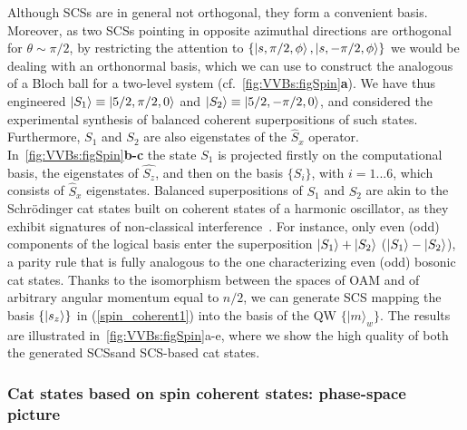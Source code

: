Although \acp{SCS} are in general not orthogonal, they form a convenient basis. Moreover, as two \acp{SCS} pointing in opposite azimuthal directions are orthogonal for $\theta\sim\pi/2$, by restricting the attention to $\{\ket{s,\pi/2,\phi},\ket{s,-\pi/2,\phi}\}$ we would be dealing with an orthonormal basis, which we can use to construct the analogous of a Bloch ball for a two-level system (cf.~\cref{fig:VVBs:figSpin}\textbf{a}). We have thus engineered $\ket{S_1}\equiv\ket{5/2,\pi/2,0}$ and $\ket{S_2}\equiv\ket{5/2,-\pi/2,0}$, and considered the experimental synthesis of balanced coherent superpositions of such states.
Furthermore, $S_1$ and $S_2$ are also eigenstates of the $\hat{S}_x$ operator. In~\cref{fig:VVBs:figSpin}\textbf{b-c} the state $S_1$ is projected firstly on the computational basis, the eigenstates of $\hat{S_z}$, and then on the basis $\{S_i\}$, with $i=1...6$, which consists of $\hat{S}_x$ eigenstates. Balanced superpositions of $S_1$ and $S_2$ are akin to the Schrödinger cat states built on coherent states of a harmonic oscillator, as they exhibit signatures of non-classical interference~\cite{agarwal1997atomic,SI}. For instance, only even (odd) components of the logical basis enter the superposition $\ket{S_1}+\ket{S_2}$ ($\ket{S_1}-\ket{S_2}$), a parity rule that is fully analogous to the one characterizing even (odd) bosonic cat states. Thanks to the isomorphism between the spaces of \ac{OAM} and of arbitrary angular momentum equal to $n/2$, we can generate \ac{SCS} mapping the basis $\{ \ket{s_z}\}$ in (\ref{spin_coherent1}) into the basis of the \ac{QW} $\{|m\rangle_w\}$. The results are illustrated in~\cref{fig:VVBs:figSpin}a-e, where we show the high quality of both the generated \acp{SCS}and \ac{SCS}-based cat states. %

\subsubsection{Cat states based on spin coherent states: phase-space picture}

